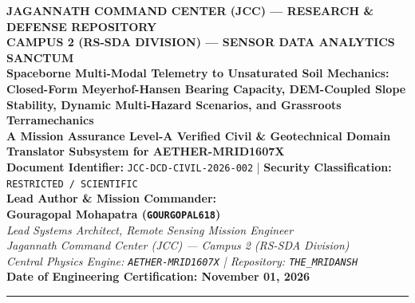 \documentclass[11pt,a4paper]{article}
\theoremstyle{definition}
\theoremstyle{remark}
\begin{document}
\begin{center}
    {\Large \textbf{JAGANNATH COMMAND CENTER (JCC) --- RESEARCH \& DEFENSE REPOSITORY}}\\[0.2cm]
    {\large \textbf{CAMPUS 2 (RS-SDA DIVISION) --- SENSOR DATA ANALYTICS SANCTUM}}\\[0.4cm]
    {\LARGE \textbf{Spaceborne Multi-Modal Telemetry to Unsaturated Soil Mechanics: Closed-Form Meyerhof-Hansen Bearing Capacity, DEM-Coupled Slope Stability, Dynamic Multi-Hazard Scenarios, and Grassroots Terramechanics}}\\[0.3cm]
    {\large \textbf{A Mission Assurance Level-A Verified Civil \& Geotechnical Domain Translator Subsystem for AETHER-MRID1607X}}\\[0.4cm]
    \textbf{Document Identifier:} \texttt{JCC-DCD-CIVIL-2026-002} \quad | \quad \textbf{Security Classification:} \texttt{RESTRICTED / SCIENTIFIC} \\[0.3cm]
    
    \textbf{Lead Author \& Mission Commander:}\\
    \textbf{Gouragopal Mohapatra (\texttt{GOURGOPAL618})}\\
    \textit{Lead Systems Architect, Remote Sensing Mission Engineer}\\
    \textit{Jagannath Command Center (JCC) --- Campus 2 (RS-SDA Division)}\\
    \textit{Central Physics Engine: \texttt{AETHER-MRID1607X} \quad | \quad Repository: \texttt{THE\_MRIDANSH}}\\[0.2cm]
    \textbf{Date of Engineering Certification: November 01, 2026}
\end{center}

\vspace{0.4cm}
\hrule
\vspace{0.4cm}
\end{document}
